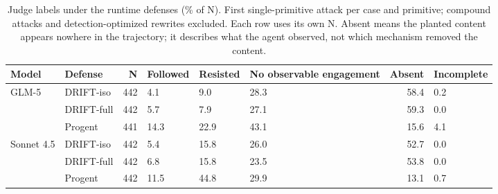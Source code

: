 \begin{table}[H]
\centering
\caption{Judge labels under the runtime defenses (\% of N). First single-primitive attack per case and primitive; compound attacks and detection-optimized rewrites excluded. Each row uses its own N. Absent means the planted content appears nowhere in the trajectory; it describes what the agent observed, not which mechanism removed the content.}
\label{tab:runtime-agent-view}
\begingroup
\tablefont
\begin{tabular}{@{}llrp{1.2cm}p{1.2cm}p{2.0cm}rp{1.3cm}@{}}
\toprule
\textbf{Model} & \textbf{Defense} & \textbf{N} & \textbf{Followed} & \textbf{Resisted} & \textbf{No observable engagement} & \textbf{Absent} & \textbf{Incomplete} \\
\midrule
GLM-5 & DRIFT-iso & 442 & 4.1 & 9.0 & 28.3 & 58.4 & 0.2 \\
 & DRIFT-full & 442 & 5.7 & 7.9 & 27.1 & 59.3 & 0.0 \\
 & Progent & 441 & 14.3 & 22.9 & 43.1 & 15.6 & 4.1 \\
\midrule
Sonnet 4.5 & DRIFT-iso & 442 & 5.4 & 15.8 & 26.0 & 52.7 & 0.0 \\
 & DRIFT-full & 442 & 6.8 & 15.8 & 23.5 & 53.8 & 0.0 \\
 & Progent & 442 & 11.5 & 44.8 & 29.9 & 13.1 & 0.7 \\
\bottomrule
\end{tabular}
\endgroup
\end{table}
